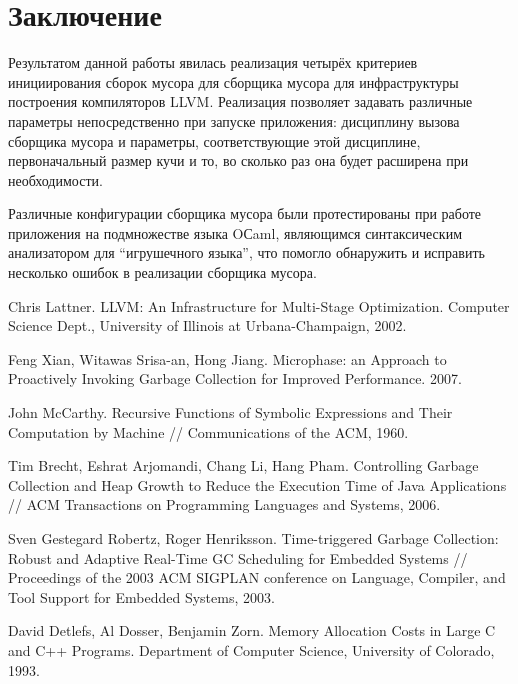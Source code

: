 \section*{Заключение}
Результатом данной работы явилась реализация
четырёх критериев инициирования сборок мусора для сборщика мусора для инфраструктуры
построения компиляторов LLVM.
Реализация позволяет задавать различные параметры непосредственно при запуске
приложения: дисциплину вызова сборщика мусора и параметры, соответствующие этой
дисциплине, первоначальный размер кучи и то, во сколько раз она будет расширена при необходимости.

Различные конфигурации сборщика мусора были протестированы при работе приложения на
подмножестве языка OСaml, являющимся синтаксическим анализатором для ``игрушечного языка'',
что помогло обнаружить и исправить несколько ошибок в реализации сборщика мусора.

\begin{thebibliography}{99}

Chris Lattner. LLVM: An Infrastructure for Multi-Stage Optimization.
Computer Science Dept., University of Illinois at Urbana-Champaign, 2002.

Feng Xian, Witawas Srisa-an, Hong Jiang.
Microphase: an Approach to Proactively Invoking Garbage Collection for Improved 
Performance. 2007.

John McCarthy.
Recursive Functions of Symbolic Expressions and Their Computation by Machine //
Communications of the ACM, 1960.

Tim Brecht, Eshrat Arjomandi, Chang Li, Hang Pham.
Controlling Garbage Collection and Heap Growth to Reduce the Execution Time 
of Java Applications // ACM Transactions on Programming Languages and Systems,
2006.

Sven Gestegard Robertz, Roger Henriksson.
Time-triggered Garbage Collection: Robust and Adaptive Real-Time GC Scheduling 
for Embedded Systems //
Proceedings of the 2003 ACM SIGPLAN conference 
on Language, Compiler, and Tool Support for Embedded Systems, 2003.

David Detlefs, Al Dosser, Benjamin Zorn.
Memory Allocation Costs in Large C and C++ Programs.
Department of Computer Science, University of Colorado, 1993.
\end{thebibliography}
